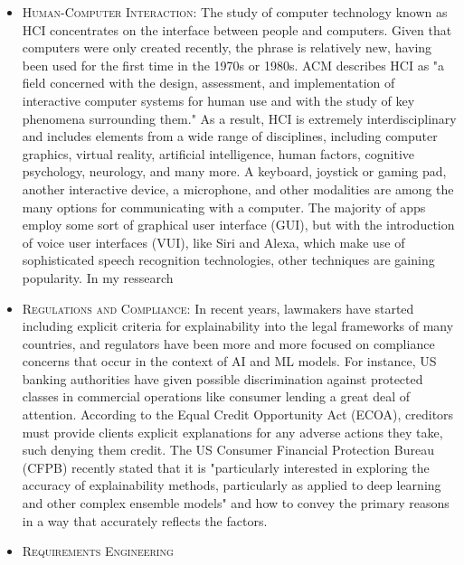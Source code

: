 \documentclass[12pt,a4paper]{article}
\begin{document}
\begin{itemize}
    \item \textsc{Human-Computer Interaction:}
    The study of computer technology known as HCI concentrates on the interface between people and computers. Given that computers were only created recently, the phrase is relatively new, having been used for the first time in the 1970s or 1980s. ACM describes HCI as "a field concerned with the design, assessment, and implementation of interactive computer systems for human use and with the study of key phenomena surrounding them."
As a result, HCI is extremely interdisciplinary and includes elements from a wide range of disciplines, including computer graphics, virtual reality, artificial intelligence, human factors, cognitive psychology, neurology, and many more.
A keyboard, joystick or gaming pad, another interactive device, a microphone, and other modalities are among the many options for communicating with a computer. The majority of apps employ some sort of graphical user interface (GUI), but with the introduction of voice user interfaces (VUI), like Siri and Alexa, which make use of sophisticated speech recognition technologies, other techniques are gaining popularity. In my ressearch
    \item \textsc{Regulations and Compliance:}
    In recent years, lawmakers have started including explicit criteria for explainability into the legal frameworks of many countries, and regulators have been more and more focused on compliance concerns that occur in the context of AI and ML models. For instance, US banking authorities have given possible discrimination against protected classes in commercial operations like consumer lending a great deal of attention.
According to the Equal Credit Opportunity Act (ECOA), creditors must provide clients explicit explanations for any adverse actions they take, such denying them credit. The US Consumer Financial Protection Bureau (CFPB) recently stated that it is "particularly interested in exploring the accuracy of explainability methods, particularly as applied to deep learning and other complex ensemble models" and how to convey the primary reasons in a way that accurately reflects the factors.
    \item \textsc{Requirements Engineering}

\end{itemize}
\end{document}
